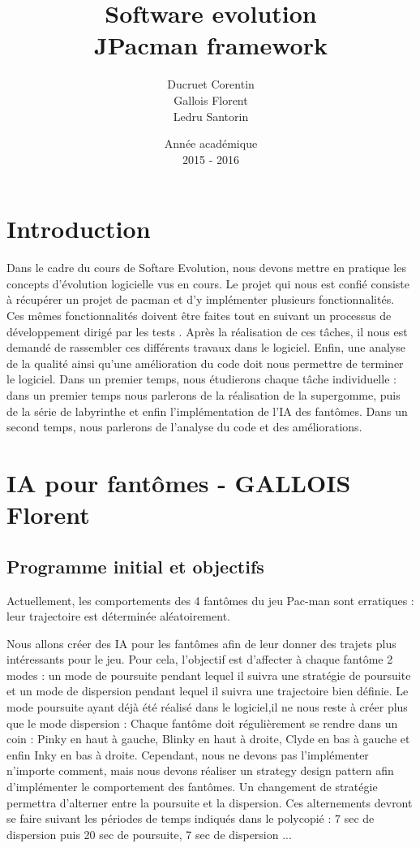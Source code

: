 \documentclass[a4paper,12pt]{report} %
\title{Software evolution \\ JPacman framework}
\author{Ducruet Corentin \\ Gallois Florent \\ Ledru Santorin}
\date{Année académique\\2015 - 2016}
\begin{document}
 
\maketitle
\newpage 
{} %
\tableofcontents
\newpage

\section{Introduction}

Dans le cadre du cours de Softare Evolution, nous devons mettre en pratique les concepts d'évolution logicielle vus en cours. Le projet qui nous est confié consiste à récupérer un projet de pacman et d'y implémenter plusieurs fonctionnalités. Ces mêmes fonctionnalités doivent être faites tout en suivant un processus de développement dirigé par les tests . Après la réalisation de ces tâches, il nous est demandé de rassembler ces différents travaux dans le logiciel. Enfin, une analyse de la qualité ainsi qu'une amélioration du code doit nous permettre de terminer le logiciel.
Dans un premier temps, nous étudierons chaque tâche individuelle : dans un premier temps nous parlerons de la réalisation de la supergomme, puis de la série de labyrinthe et enfin l'implémentation de l'IA des fantômes.
Dans un second temps, nous parlerons de l'analyse du code et des améliorations.

\section{IA pour fantômes - GALLOIS Florent}

\subsection{Programme initial et objectifs}
Actuellement, les comportements des 4 fantômes du jeu Pac-man sont erratiques : 
leur trajectoire est déterminée aléatoirement.

Nous allons créer des IA pour les fantômes afin de leur donner des trajets plus intéressants pour le jeu.
Pour cela, l'objectif est d'affecter à chaque fantôme 2 modes : un mode de poursuite pendant lequel il suivra une stratégie de poursuite et un mode de dispersion pendant lequel il suivra une trajectoire bien définie.
Le mode poursuite ayant déjà été réalisé dans le logiciel,il ne nous reste à créer plus que le mode dispersion : 
Chaque fantôme doit régulièrement se rendre dans un coin : Pinky en haut à gauche, Blinky en haut à droite, Clyde en bas à gauche et enfin Inky en bas à droite.
Cependant, nous ne devons pas l'implémenter n'importe comment, mais nous devons réaliser un strategy design pattern afin d'implémenter le comportement des fantômes.
Un changement de stratégie permettra d'alterner entre la poursuite et la dispersion.
Ces alternements devront se faire suivant les périodes de temps indiqués dans le polycopié : 7 sec de dispersion puis 20 sec de poursuite, 7 sec de dispersion ... 
\end{document}
